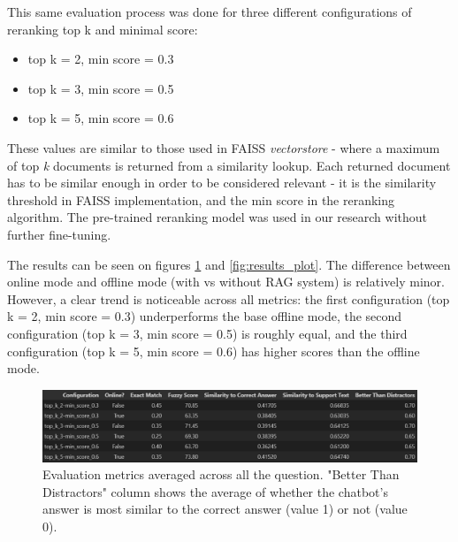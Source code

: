 \documentclass[fleqn,moreauthors,10pt]{ds_report}
\begin{document}
\newpage

This same evaluation process was done for three different configurations of reranking top k and minimal score:
\begin{itemize}
    \item top k = 2, min score = 0.3
    \item top k = 3, min score = 0.5
    \item top k = 5, min score = 0.6
\end{itemize}

These values are similar to those used in FAISS \textit{vectorstore} - where a maximum of top \textit{k} documents is returned from a similarity lookup. Each returned document has to be similar enough in order to be considered relevant - it is the similarity threshold in FAISS implementation, and the min score in the reranking algorithm. The pre-trained reranking model was used in our research without further fine-tuning.

The results can be seen on figures \ref{fig:results_table} and \ref{fig:results_plot}. The difference between online mode and offline mode (with vs without RAG system) is relatively minor. However, a clear trend is noticeable across all metrics: the first configuration (top k = 2, min score = 0.3) underperforms the base offline mode, the second configuration (top k = 3, min score = 0.5) is roughly equal, and the third configuration (top k = 5, min score = 0.6) has higher scores than the offline mode.

\begin{figure}[ht]\centering 
	\includegraphics[width=1\linewidth]{images/results_table.PNG}
	\caption{Evaluation metrics averaged across all the question. "Better Than Distractors" column shows the average of whether the chatbot's answer is most similar to the correct answer (value 1) or not (value 0).}
	\label{fig:results_table}
\end{figure}
\end{document}
